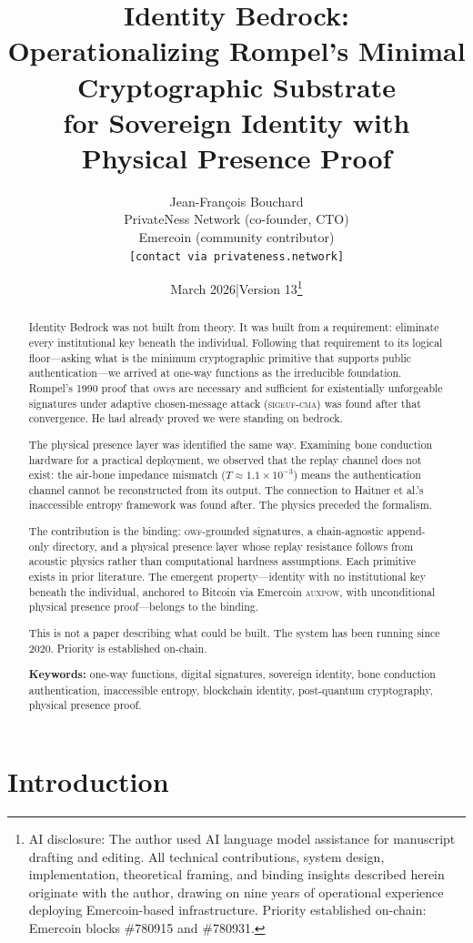 \documentclass[12pt,a4paper]{article}
\title{\textbf{Identity Bedrock:}\\[0.4em]
\large Operationalizing Rompel's Minimal Cryptographic Substrate\\
for Sovereign Identity with Physical Presence Proof}
\author{Jean-Fran\c{c}ois Bouchard\\[0.3em]
\small PrivateNess Network (co-founder, CTO)\\
\small Emercoin (community contributor)\\
\small \texttt{[contact via privateness.network]}}
\date{March 2026\quad|\quad Version 13\thanks{%
AI disclosure: The author used AI language model assistance for manuscript
drafting and editing. All technical contributions, system design,
implementation, theoretical framing, and binding insights described herein
originate with the author, drawing on nine years of operational experience
deploying Emercoin-based infrastructure.
Priority established on-chain: Emercoin blocks \#780915 and \#780931.}}
\begin{document}
\maketitle

\begin{abstract}
Identity Bedrock was not built from theory. It was built from a
requirement: eliminate every institutional key beneath the individual.
Following that requirement to its logical floor---asking what is the
minimum cryptographic primitive that supports public authentication---we
arrived at one-way functions as the irreducible foundation. Rompel's
1990 proof that \textsc{owf}s are necessary and sufficient for
existentially unforgeable signatures under adaptive chosen-message attack
(\textsc{sigeuf-cma}) was found after that convergence. He had already
proved we were standing on bedrock.

The physical presence layer was identified the same way. Examining bone
conduction hardware for a practical deployment, we observed that the
replay channel does not exist: the air-bone impedance mismatch
($T \approx 1.1 \times 10^{-3}$) means the authentication channel cannot
be reconstructed from its output. The connection to Haitner et al.'s
inaccessible entropy framework was found after. The physics preceded the
formalism.

The contribution is the binding: \textsc{owf}-grounded signatures, a
chain-agnostic append-only directory, and a physical presence layer whose
replay resistance follows from acoustic physics rather than computational
hardness assumptions. Each primitive exists in prior literature. The
emergent property---identity with no institutional key beneath the
individual, anchored to Bitcoin via Emercoin \textsc{auxpow}, with
unconditional physical presence proof---belongs to the binding.

This is not a paper describing what could be built. The system has been
running since 2020. Priority is established on-chain.

\medskip
\noindent\textbf{Keywords:} one-way functions, digital signatures,
sovereign identity, bone conduction authentication, inaccessible entropy,
blockchain identity, post-quantum cryptography, physical presence proof.
\end{abstract}

\tableofcontents
\newpage

\section{Introduction}
\end{document}
